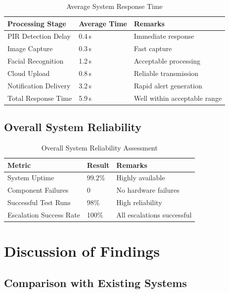 \documentclass[12pt,a4paper,oneside]{report}
\begin{document}
\begin{table}[htbp]
  \centering
  \caption{Average System Response Time}
  {\small
  \begin{tabular}{|p{5.00cm}|p{4.00cm}|p{5.00cm}|}
    \hline
    \textbf{Processing Stage} & \textbf{Average Time} & \textbf{Remarks} \\
    \hline
    PIR Detection Delay      & 0.4\,s  & Immediate response \\
    Image Capture            & 0.3\,s  & Fast capture \\
    Facial Recognition       & 1.2\,s  & Acceptable processing \\
    Cloud Upload             & 0.8\,s  & Reliable transmission \\
    Notification Delivery    & 3.2\,s  & Rapid alert generation \\
    Total Response Time      & 5.9\,s  & Well within acceptable range \\
    \hline
  \end{tabular}
  }
\end{table}

\subsection{Overall System Reliability}

\begin{table}[htbp]
  \centering
  \caption{Overall System Reliability Assessment}
  {\small
  \begin{tabular}{|p{5.00cm}|p{3.00cm}|p{6.00cm}|}
    \hline
    \textbf{Metric} & \textbf{Result} & \textbf{Remarks} \\
    \hline
    System Uptime             & 99.2\%  & Highly available \\
    Component Failures        & 0       & No hardware failures \\
    Successful Test Runs      & 98\%    & High reliability \\
    Escalation Success Rate   & 100\%   & All escalations successful \\
    \hline
  \end{tabular}
  }
\end{table}

\section{Discussion of Findings}

\subsection{Comparison with Existing Systems}
\end{document}
